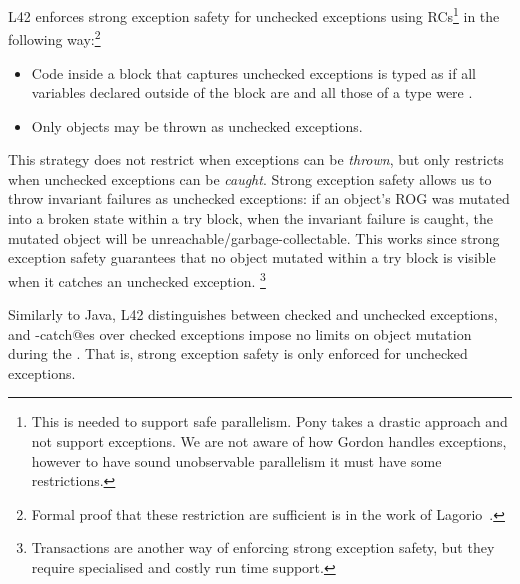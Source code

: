 L42 enforces strong exception safety for unchecked exceptions using RCs\footnote{%
This is needed to support safe parallelism. Pony takes a drastic approach and not support exceptions. 
We are not aware of how Gordon \etal handles exceptions, however to have sound unobservable parallelism it must have some restrictions.%
}
in the following way:\footnote{%
Formal proof that these restriction are sufficient
is in the work of Lagorio~\cite{JOT:issue_2011_01/article1}.
}
\begin{itemize}
\item Code inside a \Q@try@ block that captures unchecked exceptions is typed as 
if all variables declared outside of the block are \Q@final@ and all those of a \Q@mut@ type were \Q@read@.
\item Only \Q@imm@ objects may be thrown as unchecked exceptions.
\end{itemize} 
This strategy does not restrict when exceptions can be \emph{thrown}, but only restricts when unchecked exceptions can be \emph{caught}.
Strong exception safety allows us to throw invariant failures as unchecked exceptions: if an object's ROG was mutated into a broken state within a try block, when the invariant failure is caught, the mutated object will be unreachable/garbage-collectable. This works since strong exception safety guarantees that no object mutated within a try block is visible when it catches an unchecked exception.%
\footnote{Transactions are another way of enforcing strong exception safety, but they require specialised and costly run time support.}

Similarly to Java, L42 distinguishes between checked and unchecked exceptions,
and \Q@try-catch@es over checked exceptions impose no limits on object mutation during the \Q@try@.
That is, strong exception safety is only enforced for unchecked exceptions.

